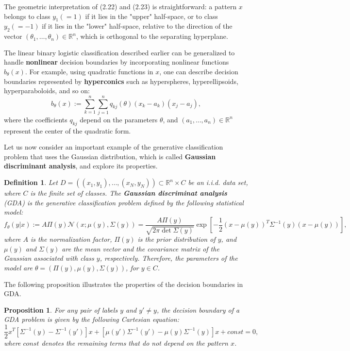 \documentclass{report}
\newtheorem{definition}{Definition}[chapter]
\newtheorem{proposition}{Proposition}[chapter]
\begin{document}
The geometric interpretation of (2.22) and (2.23) is straightforward: a pattern $x$ belongs to class $y_1 (=1)$ if it lies in the "upper" half-space, or to class $y_2(=-1)$ if it lies in the "lower" half-space, relative to the direction of the vector $(\theta_1,\dots,\theta_n) \in \mathbb{R}^n$, which is orthogonal to the separating hyperplane.

The linear binary logistic classification described earlier can be generalized to handle \textbf{nonlinear} decision boundaries by incorporating nonlinear functions $b_\theta(x)$. For example, using quadratic functions in $x$, one can describe decision boundaries represented by \textbf{hyperconics} such as hyperspheres, hyperellipsoids, hyperparaboloids, and so on:
\begin{equation}
 b_\theta(x) := \sum_{k=1}^{n}\sum_{j=1}^{n}q_{kj}(\theta)(x_k-a_k)(x_j - a_j),
\end{equation}
where the coefficients $q_{kj}$ depend on the parameters $\theta$, and $(a_1,\dots,a_n) \in \mathbb{R}^n$ represent the center of the quadratic form.

Let us now consider an important example of the generative classification problem that uses the Gaussian distribution, which is called \textbf{Gaussian discriminant analysis}, and explore its properties.

\begin{definition}
Let $D = ((x_1,y_1),\dots,(x_N,y_N)) \subset \mathbb{R}^n\times C$ be an i.i.d. data set, where $C$ is the finite set of classes. The \textbf{Gaussian discriminat analysis} (GDA) is the generative classification problem defined by the following statistical model:
\begin{equation}
f_\theta(y|x) := A \Pi(y)\mathcal{N}(x;\mu(y),\Sigma(y)) = \frac{A\Pi(y)}{\sqrt{2\pi\det \Sigma(y)}}\exp\left [-\frac{1}{2}(x-\mu(y))^T\Sigma^{-1}(y)(x-\mu(y))\right],
\end{equation}
where $A$ is the normalization factor, $\Pi(y)$ is the prior distribution of $y$, and $\mu(y)$ and $\Sigma(y)$ are the mean vector and 
the covariance matrix of the Gaussian associated with class $y$, respectively. Therefore, the parameters of the model are $\theta = (\Pi(y), \mu(y), \Sigma(y))$, for $y \in C$.
\end{definition}

The following proposition illustrates the properties of the decision boundaries in GDA.

\begin{proposition}
For any pair of labels $y$ and $y'\neq y$, the decision boundary of a GDA problem is given by the following Cartesian equation:
\begin{equation}
\frac{1}{2}x^T[\Sigma^{-1}(y)-\Sigma^{-1}(y')]x+[\mu(y')\Sigma^{-1}(y') - \mu(y)\Sigma^{-1}(y)]x + const = 0,
\end{equation}
where $const$ denotes the remaining terms that do not depend on the pattern $x$.
\end{proposition}
\end{document}
